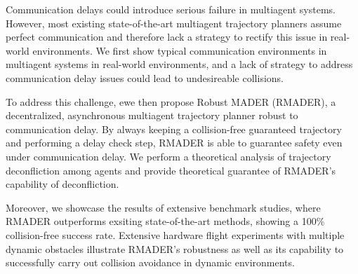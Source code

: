 % 
% 
%
Communication delays could introduce serious failure in multiagent systems.
However, most existing state-of-the-art multiagent trajectory planners assume perfect communication and therefore lack a strategy to rectify this issue in real-world environments.
We first show typical communication environments in multiagent systems in real-world environments, and a lack of strategy to address communication delay issues could lead to undesireable collisions.

To address this challenge, ewe then propose Robust MADER (RMADER), a decentralized, asynchronous multiagent trajectory planner robust to communication delay.
By always keeping a collision-free guaranteed trajectory and performing a delay check step, RMADER is able to guarantee safety even under communication delay.
We perform a theoretical analysis of trajectory deconfliction among agents and provide theoretical guarantee of RMADER's capability of deconfliction.

Moreover, we showcase the results of extensive benchmark studies, where RMADER outperforms exsiting state-of-the-art methods, showing a 100\% collision-free success rate. Extensive hardware flight experiments with multiple dynamic obstacles illustrate RMADER's robustness as well as its capability to successfully carry out collision avoidance in dynamic environments.
